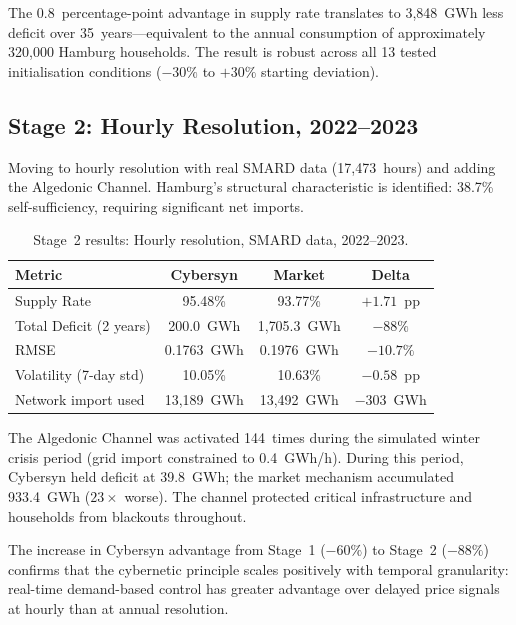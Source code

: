 \documentclass[12pt]{article}
\begin{document}
The 0.8~percentage-point advantage in supply rate translates to 3{,}848~GWh less
deficit over 35~years---equivalent to the annual consumption of approximately
320{,}000 Hamburg households.
The result is robust across all 13 tested initialisation conditions
($-30\%$ to $+30\%$ starting deviation).

\subsection{Stage 2: Hourly Resolution, 2022--2023}

Moving to hourly resolution with real SMARD data (17{,}473~hours) and adding the
Algedonic Channel.
Hamburg's structural characteristic is identified: 38.7\% self-sufficiency, requiring
significant net imports.

\begin{table}[H]
  \centering
  \caption{Stage~2 results: Hourly resolution, SMARD data, 2022--2023.}
  \label{tab:stage2}
  \begin{tabular}{lccc}
    \toprule
    \textbf{Metric} & \textbf{Cybersyn} & \textbf{Market} & \textbf{Delta} \\
    \midrule
    Supply Rate               & 95.48\%      & 93.77\%      & $+1.71$~pp \\
    Total Deficit (2 years)   & 200.0~GWh    & 1{,}705.3~GWh  & $-88\%$ \\
    RMSE                      & 0.1763~GWh   & 0.1976~GWh   & $-10.7\%$ \\
    Volatility (7-day std)    & 10.05\%      & 10.63\%      & $-0.58$~pp \\
    Network import used       & 13{,}189~GWh & 13{,}492~GWh & $-303$~GWh \\
    \bottomrule
  \end{tabular}
\end{table}

The Algedonic Channel was activated 144~times during the simulated winter crisis
period (grid import constrained to 0.4~GWh/h).
During this period, Cybersyn held deficit at 39.8~GWh; the market mechanism accumulated
933.4~GWh ($23\times$ worse).
The channel protected critical infrastructure and households from blackouts throughout.

The increase in Cybersyn advantage from Stage~1 ($-60\%$) to Stage~2 ($-88\%$)
confirms that the cybernetic principle scales positively with temporal granularity:
real-time demand-based control has greater advantage over delayed price signals at
hourly than at annual resolution.
\end{document}
